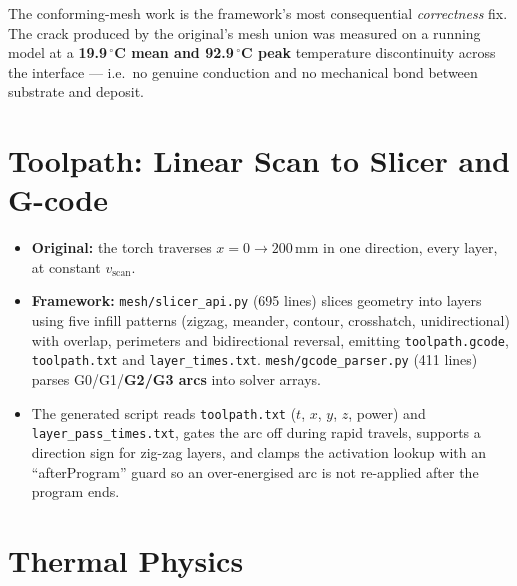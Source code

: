\documentclass[10pt,a4paper]{article}
\newcommand{\code}[1]{\texttt{#1}}
\newcommand{\file}[1]{\texttt{\small #1}}
\begin{document}
The conforming-mesh work is the framework's most consequential \emph{correctness}
fix. The crack produced by the original's mesh union was measured on a running
model at a \textbf{19.9\,$^\circ$C mean and 92.9\,$^\circ$C peak} temperature
discontinuity across the interface --- i.e.\ no genuine conduction and no
mechanical bond between substrate and deposit.

\section{Toolpath: Linear Scan to Slicer and G-code}

\begin{itemize}[leftmargin=1.4em,itemsep=0.2em]
    \item \textbf{Original:} the torch traverses $x = 0 \rightarrow 200$\,mm in
    one direction, every layer, at constant $v_{\text{scan}}$.
    \item \textbf{Framework:} \file{mesh/slicer\_api.py} (695 lines) slices
    geometry into layers using five infill patterns (zigzag, meander, contour,
    crosshatch, unidirectional) with overlap, perimeters and bidirectional
    reversal, emitting \code{toolpath.gcode}, \code{toolpath.txt} and
    \code{layer\_times.txt}. \file{mesh/gcode\_parser.py} (411 lines) parses
    G0/G1/\textbf{G2/G3 arcs} into solver arrays.
    \item The generated script reads \code{toolpath.txt} ($t$, $x$, $y$, $z$,
    power) and \code{layer\_pass\_times.txt}, gates the arc off during rapid
    travels, supports a direction sign for zig-zag layers, and clamps the
    activation lookup with an ``afterProgram'' guard so an over-energised arc
    is not re-applied after the program ends.
\end{itemize}

\section{Thermal Physics}
\end{document}
